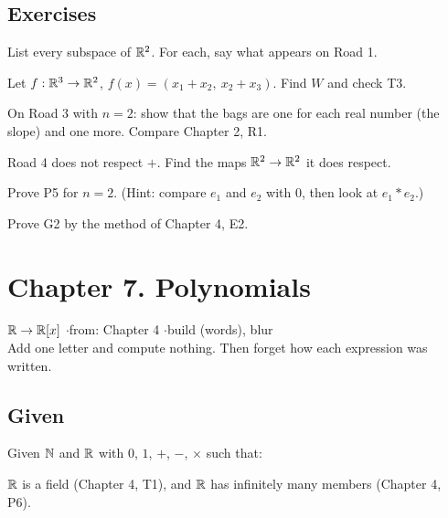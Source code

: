 \subsection*{Exercises}

\begin{lines}
\item[\lab{E1}] List every subspace of $\mathbb{R}^2$. For each, say what appears on Road 1.
\item[\lab{E2}] Let $f : \mathbb{R}^3 \to \mathbb{R}^2$, $f(x) = (x_1 + x_2,\ x_2 + x_3)$. Find $W$ and check T3.
\item[\lab{E3}] On Road 3 with $n = 2$: show that the bags are one for each real number (the slope) and one more. Compare Chapter 2, R1.
\item[\lab{E4}] Road 4 does not respect $+$. Find the maps $\mathbb{R}^2 \to \mathbb{R}^2$ it does respect.
\item[\lab{E5}] Prove P5 for $n = 2$. (Hint: compare $e_1$ and $e_2$ with $0$, then look at $e_1 \ast e_2$.)
\item[\lab{E6}] Prove G2 by the method of Chapter 4, E2.
\end{lines}

\newpage

\section*{Chapter 7. Polynomials}
\begin{center}
{\normalsize $\mathbb{R} \to \mathbb{R}[x]$ \quad$\cdot$\quad from: Chapter 4 \quad$\cdot$\quad build (words), blur}\\[4pt]
{\small Add one letter and compute nothing. Then forget how each expression was written.}
\end{center}

\subsection*{Given}

Given $\mathbb{N}$ and $\mathbb{R}$ with $0$, $1$, $+$, $-$, $\times$ such that:
\begin{lines}
\item[\lab{G1}] $\mathbb{R}$ is a field (Chapter 4, T1), and $\mathbb{R}$ has infinitely many members (Chapter 4, P6).
\end{lines}

